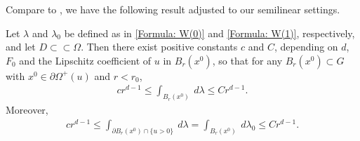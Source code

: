 \documentclass[11pt,reqno]{amsart}
\begin{document}
Compare to \cite[Theorem 4.3]{AC1981}, we have the following result adjusted to our semilinear settings.
\begin{proposition}\label{Proposition: The measure lambda and lambda0}
	Let $\lambda$ and $\lambda_{0}$ be defined as in \eqref{Formula: W(0)} and \eqref{Formula: W(1)}, respectively, and let $D\subset\subset\Omega$. Then there exist positive constants $c$ and $C$, depending on $d$, $F_{0}$ and the Lipschitz coefficient of $u$ in $B_{r}(x^{0})$, so that for any $B_{r}(x^{0})\subset G$ with $x^{0}\in\partial\varOmega^{+}(u)$ and $r<r_{0}$,
	\begin{align}\label{Formula: W(2)}
		cr^{d-1}\leqslant\int_{B_{r}(x^{0})}\:d\lambda\leqslant Cr^{d-1}.
	\end{align}
	Moreover,
	\begin{align}\label{Formula: W(2')}
		cr^{d-1}\leqslant\int_{\partial B_{r}(x^{0})\cap\{u>0\}}\:d\lambda=\int_{B_{r}(x^{0})}\:d\lambda_{0}\leqslant Cr^{d-1}.
	\end{align}
\end{proposition}
\end{document}
